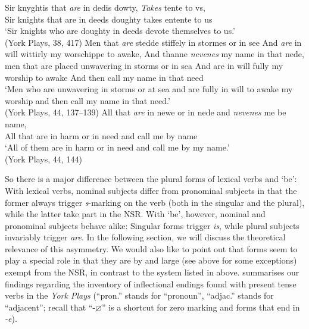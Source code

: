 \documentclass[output=paper]{langsci/langscibook}
\begin{document}
\ea
\label{rule-be}
\ea \gll Sir knyghtis that \textit{are} in dedis dowty, \textit{Takes} tente to vs,\\
Sir knights that are in deeds doughty takes entente to us\\
\glt `Sir knights who are doughty in deeds devote themselves to us.'\\
(York Plays, 38, 417)
\ex \gll Men that \textit{are} stedde stiffely in stormes or in see And \textit{are} in will wittirly my worschippe to awake, And thanne \textit{nevenes} my name in that nede, \\
men that are placed unwavering in storms or in sea And are in will fully my worship to awake And then call my name in that need \\
\glt `Men who are unwavering in storms or at sea and are fully in will to awake my worship and then call my name in that need.' \\
(York Plays, 44, 137--139)
\ex \gll All that \textit{are} in newe or in nede and \textit{nevenes} me be name,\\
All that are in harm or in need and call me by name\\
\glt `All of them are in harm or in need and call me by my name.'\\
(York Plays, 44, 144)
\z
\z

So there is a major difference between the plural forms of lexical verbs and
`be': With lexical verbs, nominal subjects differ from pronominal subjects in
that the former always trigger \emph{s}-marking on the verb (both in the
singular and the plural), while the latter take part in the \gls{NSR}. With
`be', however, nominal and pronominal subjects behave alike: Singular forms
trigger \emph{is}, while plural subjects invariably trigger \emph{are}. In the
following section, we will discuss the theoretical relevance of this asymmetry.
We would also like to point out that \Fsg{} forms seem to play a special role
in that they are by and large (see above for some exceptions) exempt from the
\gls{NSR}, in contrast to the system listed in  above.
 summarises our findings regarding the inventory of inflectional
endings found with present tense verbs in the \emph{York Plays} (``pron.'' stands
for ``pronoun'', ``adjac.'' stands for ``adjacent''; recall that
``-$\varnothing$'' is a shortcut
for zero marking and forms that end in \emph{-e}).
\end{document}
